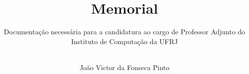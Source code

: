\documentclass[a4paper,11pt]{article}
\title{Memorial}
\author[]{Documentação necessária para a candidatura ao cargo de Professor Adjunto do 
          Instituto de Computação da UFRJ\\}
\author[]{\\João Victor da Fonseca Pinto}
\begin{document}
 
\maketitle
\flushbottom

\newpage




\newpage

















\end{document}
